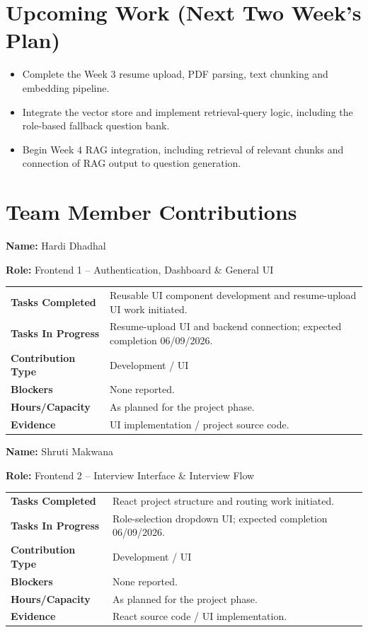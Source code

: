 \documentclass[11pt,a4paper]{article}
\newcommand{\field}[2]{\textbf{#1:} #2\par}
\begin{document}
\section{Upcoming Work (Next Two Week's Plan)}

\begin{itemize}
    \item Complete the Week 3 resume upload, PDF parsing, text chunking and embedding pipeline.
    \item Integrate the vector store and implement retrieval-query logic, including the role-based fallback question bank.
    \item Begin Week 4 RAG integration, including retrieval of relevant chunks and connection of RAG output to question generation.
\end{itemize}

\section{Team Member Contributions}

\vspace{10pt}

\hspace{0.58cm}\field{Name}{Hardi Dhadhal}
\field{Role}{Frontend 1 -- Authentication, Dashboard \& General UI}

\vspace{4pt}
\begin{tabular}{>{\bfseries}p{} p{}}
\toprule
Tasks Completed & Reusable UI component development and resume-upload UI work initiated. \\
Tasks In Progress & Resume-upload UI and backend connection; expected completion 06/09/2026. \\
Contribution Type & Development / UI \\
Blockers & None reported. \\
Hours/Capacity & As planned for the project phase. \\
Evidence & UI implementation / project source code. \\
\bottomrule
\end{tabular}

\vspace{10pt}
\field{Name}{Shruti Makwana}
\field{Role}{Frontend 2 -- Interview Interface \& Interview Flow}

\vspace{4pt}
\begin{tabular}{>{\bfseries}p{} p{}}
\toprule
Tasks Completed & React project structure and routing work initiated. \\
Tasks In Progress & Role-selection dropdown UI; expected completion 06/09/2026. \\
Contribution Type & Development / UI \\
Blockers & None reported. \\
Hours/Capacity & As planned for the project phase. \\
Evidence & React source code / UI implementation. \\
\bottomrule
\end{tabular}
\end{document}
